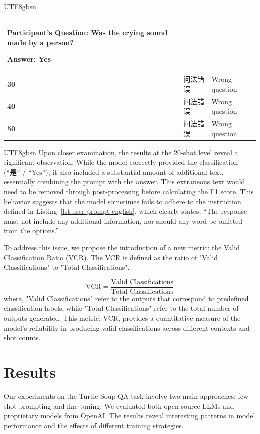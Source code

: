 \documentclass[conference]{IEEEtran}
\begin{document}
\begin{table}[h!]
\begin{CJK*}{UTF8}{gbsn}
{\begin{tabular}{|l|p{6.5cm}|p{10cm}|}
Participant’s Question: Was the crying sound made by a person?

Answer: Yes \\ \hline
\textbf{30} & 问法错误 & Wrong question \\ \hline
\textbf{40} & 问法错误 & Wrong question \\ \hline
\textbf{50} & 问法错误 & Wrong question \\ \hline
\end{tabular}
}
\end{CJK*}
\end{table}


\begin{CJK*}{UTF8}{gbsn}
Upon closer examination, the results at the 20-shot level reveal a significant observation. While the model correctly provided the classification (“是” / “Yes”), it also included a substantial amount of additional text, essentially combining the prompt with the answer. This extraneous text would need to be removed through post-processing before calculating the F1 score. This behavior suggests that the model sometimes fails to adhere to the instruction defined in Listing~\ref{lst:user-prompt-english}, which clearly states, “The response must not include any additional information, nor should any word be omitted from the options.”
\end{CJK*}

To address this issue, we propose the introduction of a new metric: the Valid Classification Ratio (VCR). The VCR is defined as the ratio of "Valid Classifications" to "Total Classifications". 

\begin{equation}
\text{VCR} = \frac{\text{Valid Classifications}}{\text{Total Classifications}}
\end{equation}
%
where, "Valid Classifications" refer to the outputs that correspond to predefined classification labels, while "Total Classifications" refer to the total number of outputs generated. This metric, VCR, provides a quantitative measure of the model's reliability in producing valid classifications across different contexts and shot counts.
\section{Results}
Our experiments on the Turtle Soup QA task involve two main approaches: few-shot prompting and fine-tuning. We evaluated both open-source LLMs and proprietary models from OpenAI. The results reveal interesting patterns in model performance and the effects of different training strategies.
\end{document}
